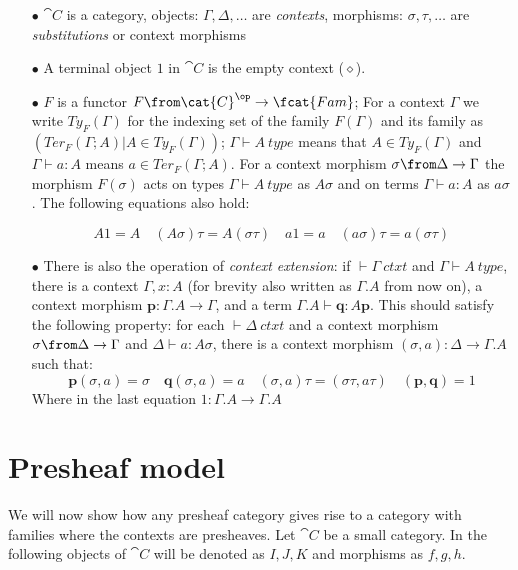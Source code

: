 \begin{itemize}
  \item[$\bullet$] $\cat{C}$ is a category, objects: $\Gamma, \Delta, \dots$ are
    \emph{contexts}, morphisms:  $\sigma, \tau, \dots$ are
    \emph{substitutions} or context morphisms

  \item[$\bullet$] A terminal object $1$ in $\cat{C}$ is the empty context ($\diamond$).

  \item[$\bullet$] $F$ is a functor $F\from \cat{C}^\op \to \fcat{Fam}$; For a
    context $\Gamma$ we write $Ty_F(\Gamma)$ for the indexing set of the family
    $F(\Gamma)$ and its family as $(Ter_F(\Gamma;A) | A \in Ty_F(\Gamma))$;
    $\Gamma \vdash A~type$ means that $A \in Ty_F(\Gamma)$ and $\Gamma \vdash a
    : A$ means $a \in Ter_F(\Gamma;A)$. For a context morphism $\sigma \from
    \Delta \to \Gamma$ the morphism $F(\sigma)$ acts on types $\Gamma \vdash
    A~type$ as $A\sigma$ and on terms $\Gamma \vdash a : A$ as $a\sigma$. The
    following equations also hold:

    \[
      A1=A \quad (A\sigma)\tau = A(\sigma\tau) \quad a1=a \quad (a\sigma)\tau=a(\sigma\tau)
    \]

  \item[$\bullet$] There is also the operation of \emph{context extension}: if
    $\vdash \Gamma~ctxt$ and $\Gamma \vdash A~type$, there is a context
    $\Gamma, x:A$ (for brevity also written as $\Gamma.A$ from now on), a
    context morphism $\mathbf{p}: \Gamma.A \to \Gamma$, and a term $\Gamma.A
    \vdash \mathbf{q} : A \mathbf{p}$. This should satisfy the following
    property: for each $\vdash \Delta~ctxt$ and a context morphism
    $\sigma \from \Delta \to \Gamma$ and $\Delta \vdash a : A \sigma$, there is
    a context morphism $(\sigma, a): \Delta \to \Gamma.A$ such that:
    \[
      \mathbf{p}(\sigma, a) = \sigma \quad \mathbf{q}(\sigma, a) = a \quad (\sigma, a) \tau =
      (\sigma \tau, a \tau) \quad (\mathbf{p}, \mathbf{q}) = 1
    \]
    Where in the last equation $1: \Gamma.A \to \Gamma.A$
\end{itemize}

\section*{Presheaf model}

We will now show how any presheaf category gives rise to a category with
families where the contexts are presheaves.  Let $\cat{C}$ be a small category.
In the following objects of $\cat{C}$ will be denoted as $I,J,K$ and morphisms
as $f,g,h$.

